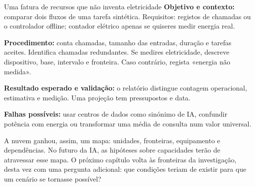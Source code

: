 \begin{promptlabbox}{Uma fatura de recursos que não inventa eletricidade}
\textbf{Objetivo e contexto:} comparar dois fluxos de uma tarefa sintética. Requisitos: registos de chamadas ou o controlador offline; contador elétrico apenas se quiseres medir energia real.

\textbf{Procedimento:} conta chamadas, tamanho das entradas, duração e tarefas aceites. Identifica chamadas redundantes. Se medires eletricidade, descreve dispositivo, base, intervalo e fronteira. Caso contrário, regista «energia não medida».

\textbf{Resultado esperado e validação:} o relatório distingue contagem operacional, estimativa e medição. Uma projeção tem pressupostos e data.

\textbf{Falhas possíveis:} usar centros de dados como sinónimo de IA, confundir potência com energia ou transformar uma média de consulta num valor universal.
\end{promptlabbox}

A nuvem ganhou, assim, um mapa: unidades, fronteiras, equipamento e dependências. No futuro da IA, as hipóteses sobre capacidades terão de atravessar esse mapa. O próximo capítulo volta às fronteiras da investigação, desta vez com uma pergunta adicional: que condições teriam de existir para que um cenário se tornasse possível?
